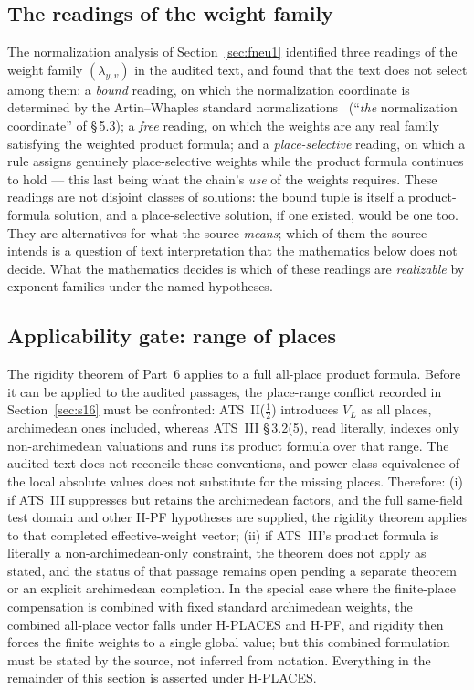 \documentclass[11pt,a4paper]{article}
\theoremstyle{definition}
\theoremstyle{remark}
\begin{document}
\subsection{The readings of the weight family}

The normalization analysis of Section~\ref{sec:fneu1} identified three
readings of the weight family $(\lambda_{y,v})$ in the audited text, and
found that the text does not select among them: a \emph{bound} reading, on
which the normalization coordinate is determined by the Artin--Whaples
standard normalizations~\cite{artinwhaples} (``\emph{the} normalization
coordinate'' of \S\,5.3); a \emph{free} reading, on which the weights are any
real family satisfying the weighted product formula; and a
\emph{place-selective} reading, on which a rule assigns genuinely
place-selective weights while the product formula continues to hold ---
this last being what the chain's \emph{use} of the weights requires. These
readings are not disjoint classes of solutions: the bound tuple is itself a
product-formula solution, and a place-selective solution, if one existed,
would be one too. They are alternatives for what the source \emph{means};
which of them the source intends is a question of text interpretation that
the mathematics below does not decide. What the mathematics decides is
which of these readings are \emph{realizable} by exponent families under
the named hypotheses.

\subsection{Applicability gate: range of places}\label{sec:gate}

The rigidity theorem of Part~6 applies to a full all-place product formula.
Before it can be applied to the audited passages, the place-range conflict
recorded in Section~\ref{sec:s16} must be confronted: ATS~II($\tfrac12$)
introduces $V_L$ as all places, archimedean ones included, whereas ATS~III
\S\,3.2(5), read literally, indexes only non-archimedean valuations and runs
its product formula over that range. The audited text does not reconcile
these conventions, and power-class equivalence of the local absolute values
does not substitute for the missing places. Therefore: (i) if ATS~III
suppresses but retains the archimedean factors, and the full same-field
test domain and other H-PF hypotheses are supplied, the rigidity theorem
applies to that completed effective-weight vector; (ii) if
ATS~III's product formula is literally a non-archimedean-only constraint,
the theorem does not apply as stated, and the status of that passage
remains open pending a separate theorem or an explicit archimedean
completion. In the special case where the finite-place compensation is
combined with fixed standard archimedean weights, the combined all-place
vector falls under H-PLACES and H-PF, and rigidity then forces the finite
weights to a single global value; but this combined formulation must be
stated by the source, not inferred from notation. Everything in the
remainder of this section is asserted under H-PLACES.
\end{document}
